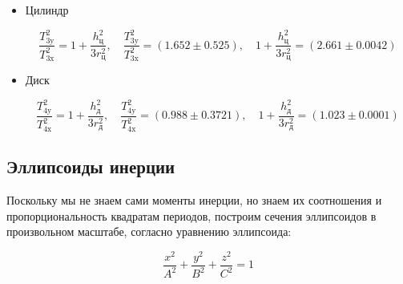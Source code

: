 \documentclass[a4paper,12pt]{article}
\newcommand{\var}[1]{\DTLfetch{output_data}{thekey}{#1}{thevalue}}
\begin{document}
\begin{itemize}
        $$\frac{T_{\text{1y}}^2 + T_{\text{1z}}^2}{2} = T_{\text{1e}}^2, \quad
        \frac{T_{\text{1y}}^2 + T_{\text{1z}}^2}{2} = (\var{form12} \pm \var{error12}) c^2, \quad
        T_{\text{1e}}^2 = (\var{T1e**2} \pm 0.26) c^2$$

        $$\frac{T_{\text{1x}}^2 + T_{\text{1z}}^2}{2} = T_{\text{1p}}^2, \quad
        \frac{T_{\text{1x}}^2 + T_{\text{1z}}^2}{2} = (\var{form13} \pm \var{error13}) c^2, \quad
        T_{\text{1p}}^2 = (\var{T1p**2} \pm 0.26) c^2$$

        $$\frac{T_{\text{1y}}^2 + T_{\text{1x}}^2}{2} = T_{\text{1m}}^2, \quad
        \frac{T_{\text{1y}}^2 + T_{\text{1x}}^2}{2} = (\var{form14} \pm \var{error14}) c^2, \quad
        T_{\text{1m}}^2 = (\var{T1m**2} \pm 0.26) c^2$$


        \item {Цилиндр}

        $$\frac{T_{\text{3y}}^2}{T_{\text{3x}}^2} = 1 + \frac{h_{\text{ц}}^2}{3 r_{\text{ц}}^2}, \quad
        \frac{T_{\text{3y}}^2}{T_{\text{3x}}^2} = (1.652 \pm 0.525), \quad
        1 + \frac{h_{\text{ц}}^2}{3 r_{\text{ц}}^2} = (2.661 \pm 0.0042)$$


        \item {Диск}

        $$\frac{T_{\text{4y}}^2}{T_{\text{4x}}^2} = 1 + \frac{h_{\text{д}}^2}{3 r_{\text{д}}^2}, \quad
        \frac{T_{\text{4y}}^2}{T_{\text{4x}}^2} = (0.988 \pm 0.3721), \quad
        1 + \frac{h_{\text{д}}^2}{3 r_{\text{д}}^2} = (1.023 \pm 0.0001)$$

    \end{itemize}

    \subsection* {Эллипсоиды инерции}

    Поскольку мы не знаем сами моменты инерции, но знаем их соотношения и пропорциональность квадратам периодов,
    построим сечения эллипсоидов в произвольном масштабе, согласно уравнению эллипсоида:

    $$\frac{x^2}{A^2} + \frac{y^2}{B^2} + \frac{z^2}{C^2} = 1$$
\end{document}
